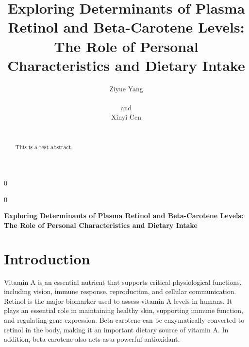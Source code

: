\documentclass[12pt]{article}
\newcommand{\blind}{0}
\begin{document}
\def\spacingset#1{\renewcommand{\baselinestretch}%
{#1}\small\normalsize} \spacingset{1}



\blind
{
  \title{\bf Exploring Determinants of Plasma Retinol and Beta-Carotene
Levels: The Role of Personal Characteristics and Dietary Intake}

  \author{
        Ziyue Yang \\
    \\
     and \\     Xinyi Cen \\
    \\
      }
  \maketitle
} \fi

\blind
{
  \bigskip
  \bigskip
  \bigskip
  \begin{center}
    {\LARGE\bf Exploring Determinants of Plasma Retinol and
Beta-Carotene Levels: The Role of Personal Characteristics and Dietary
Intake}
  \end{center}
  \medskip
} \fi

\bigskip
\begin{abstract}
This is a test abstract.
\end{abstract}

\noindent%
 

\vfill

\newpage
\spacingset{1.9} %

\section{Introduction}\label{introduction}

Vitamin A is an essential nutrient that supports critical physiological
functions, including vision, immune response, reproduction, and cellular
communication\citep{Blaner2020, Ross2014, InstituteofMedicine2000}.
Retinol is the major biomarker used to assess vitamin A levels in
humans\citep{Blaner2020}. It plays an essential role in maintaining
healthy skin, supporting immune function, and regulating gene
expression\citep{huang_role_2018}. Beta-carotene can be enzymatically
converted to retinol in the body, making it an important dietary source
of vitamin A\citep{grune_carotene_2010}. In addition, beta-carotene also
acts as a powerful antioxidant\citep{fiedor_potential_2014}.
\end{document}
